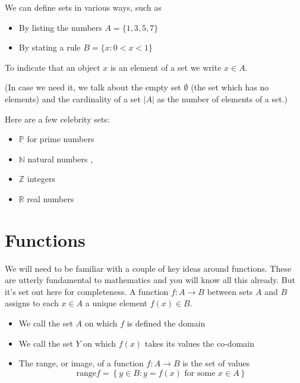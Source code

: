 \documentclass[12pt]{extbook}
\begin{document}
We can define sets in various ways, such as 

\begin{itemize}
\item By listing the numbers $A=\{1,3,5,7\}$
\item By stating a rule $B=\{ x:0 < x < 1\}$
\end{itemize}


To indicate that an object $x$ is an element of a set we write $x \in A$.

(In case we need it, we talk about the empty set $\emptyset$ (the set which has no elements) and the cardinality of a set $|A|$ as the number of elements of a set.)


Here are a few celebrity sets:

\begin{itemize}
\item $\mathbb{P}$ for prime numbers
\item $\mathbb{N}$ natural numbers ,
\item $\mathbb{Z}$ integers 
\item $\mathbb{R}$  real numbers
\end{itemize}


\section{Functions}

We will need to be familiar with a couple of key ideas around functions.   These are utterly fundamental to mathematics and you will know all this already.   But it's set out here for completeness.   A function $f: A \to B$ between sets $A$ and $B$ assigns to each $x \in A$ a unique element $f(x) \in B$.   

\begin{itemize}
\item We call the set $A$ on which $f$ is defined the domain
\item We call the set $Y$ on which $f(x)$ takes its values the co-domain
\item The range, or image, of a function $f : A \to B$ is the set of values 
\begin{displaymath}
\mbox{range} f= \left\{ y \in B : y=f(x) \mbox{ for some } x \in A \right\}
\end{displaymath}
\end{itemize}
\end{document}
